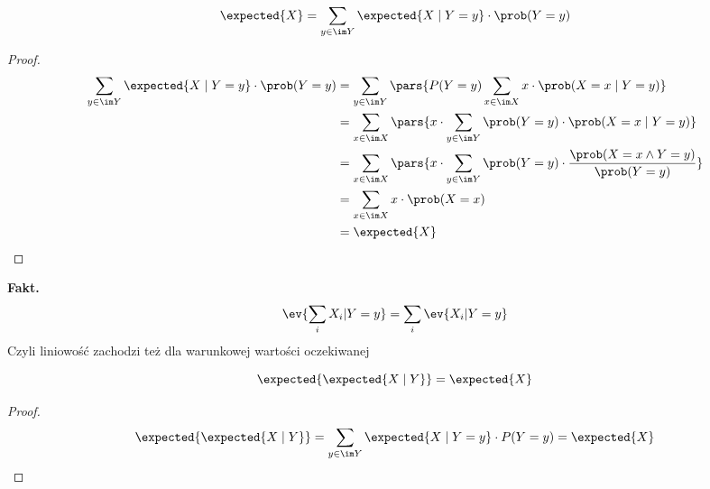 \begin{lemma}
	\label{ev-equal-to-sum-of-conditional-ev}
	\[
		\expected{X} = \sum_{y \in \im Y} \expected{X \mid Y = y} \cdot \prob(Y = y)
	\]
\end{lemma}
\begin{proof}
	\begin{align*}
		\sum_{y \in \im Y} \expected{X \mid Y = y} \cdot \prob(Y = y)
		 & = \sum_{y \in \im Y} \pars{P(Y = y) \sum_{x \in \im X} x \cdot \prob(X = x \mid Y = y)}       \\
		 & = \sum_{x \in \im X} \pars{x \cdot \sum_{y \in \im Y}\prob(Y = y)  \cdot \prob(X = x \mid Y = y)} \\
		 & = \sum_{x \in \im X} \pars{x \cdot \sum_{y \in \im Y}\prob(Y = y)  \cdot
		\frac{\prob(X = x \land Y = y)}{\prob(Y = y)}}                                                       \\
		 & = \sum_{x \in \im X} x \cdot \prob(X = x)                                                     \\
		 & = \expected{X}
	\end{align*}
\end{proof}

\textbf{Fakt.}
\[
    \ev{\sum_i X_i | Y = y} = \sum_i \ev{X_i | Y = y}
\]
Czyli liniowość zachodzi też dla warunkowej wartości oczekiwanej

\begin{lemma}
	\[
		\expected{\expected{X \mid Y}} = \expected{X}
	\]
\end{lemma}
\begin{proof}
	\begin{equation*}
		\expected{\expected{X \mid Y}}
		= \sum_{y \in \im Y} \expected{X \mid Y = y} \cdot P(Y = y) = \expected{X}
	\end{equation*}
\end{proof}